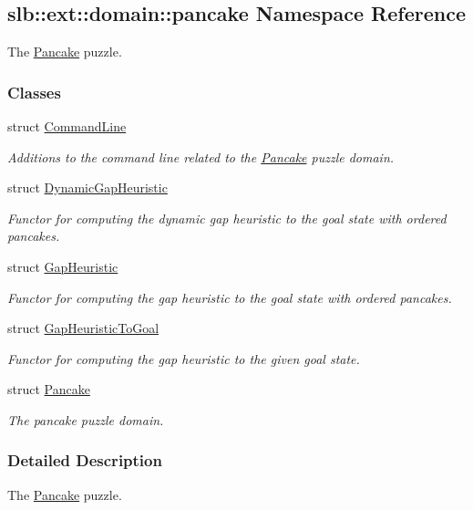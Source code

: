 \hypertarget{namespaceslb_1_1ext_1_1domain_1_1pancake}{}\subsection{slb\+:\+:ext\+:\+:domain\+:\+:pancake Namespace Reference}
\label{namespaceslb_1_1ext_1_1domain_1_1pancake}


The \hyperlink{structslb_1_1ext_1_1domain_1_1pancake_1_1Pancake}{Pancake} puzzle.  


\subsubsection*{Classes}
\begin{DoxyCompactItemize}
\item 
struct \hyperlink{structslb_1_1ext_1_1domain_1_1pancake_1_1CommandLine}{Command\+Line}
\begin{DoxyCompactList}\small\item\em Additions to the command line related to the \hyperlink{structslb_1_1ext_1_1domain_1_1pancake_1_1Pancake}{Pancake} puzzle domain. \end{DoxyCompactList}\item 
struct \hyperlink{structslb_1_1ext_1_1domain_1_1pancake_1_1DynamicGapHeuristic}{Dynamic\+Gap\+Heuristic}
\begin{DoxyCompactList}\small\item\em Functor for computing the dynamic gap heuristic to the goal state with ordered pancakes. \end{DoxyCompactList}\item 
struct \hyperlink{structslb_1_1ext_1_1domain_1_1pancake_1_1GapHeuristic}{Gap\+Heuristic}
\begin{DoxyCompactList}\small\item\em Functor for computing the gap heuristic to the goal state with ordered pancakes. \end{DoxyCompactList}\item 
struct \hyperlink{structslb_1_1ext_1_1domain_1_1pancake_1_1GapHeuristicToGoal}{Gap\+Heuristic\+To\+Goal}
\begin{DoxyCompactList}\small\item\em Functor for computing the gap heuristic to the given goal state. \end{DoxyCompactList}\item 
struct \hyperlink{structslb_1_1ext_1_1domain_1_1pancake_1_1Pancake}{Pancake}
\begin{DoxyCompactList}\small\item\em The pancake puzzle domain. \end{DoxyCompactList}\end{DoxyCompactItemize}


\subsubsection{Detailed Description}
The \hyperlink{structslb_1_1ext_1_1domain_1_1pancake_1_1Pancake}{Pancake} puzzle. 
